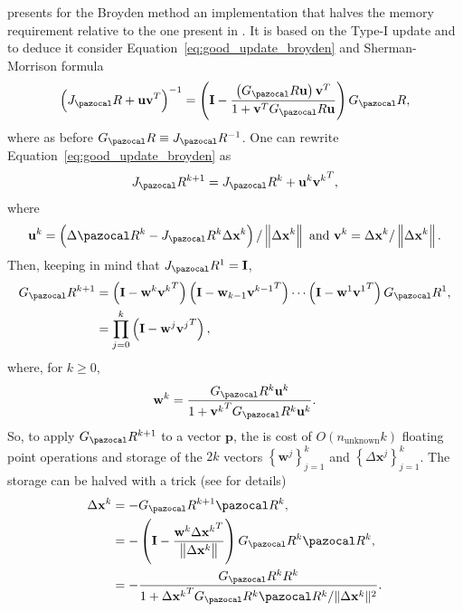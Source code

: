 \cite{kelley_solving_2003} presents for the Broyden method an implementation that halves the memory requirement relative to the one present in \cite{fang_two_2009}.
It is based on the Type-I update and to deduce it consider Equation~\eqref{eq:good_update_broyden} and Sherman-Morrison formula
\begin{equation}
  \left(J_\pazocal R+ \mathbf u \mathbf v^{T}\right)^{-1}=\left(\mathbf I- \frac{\left(G_\pazocal R \mathbf u\right) \mathbf v^{T}}{1+\mathbf v^{T} G_\pazocal R \mathbf u}\right) G_\pazocal R,
\end{equation}
where as before \(G_\pazocal R\equiv J_\pazocal R^{-1}\).
One can rewrite Equation~\eqref{eq:good_update_broyden} as
\begin{equation}
  J_\pazocal R^{k+1}=J_\pazocal R^k+ \mathbf u^k {\mathbf v^k}^{T},
\end{equation}
where
\begin{equation}
  \mathbf u^k=\left(\Delta \pazocal R^k - J_\pazocal R^k \Delta \mathbf x^{k}\right) /\left\|\Delta \mathbf x^{k}\right\| \text { and } \mathbf v^{k}=\Delta \mathbf x^{k} /\left\|\Delta \mathbf x^{k}\right\|.
\end{equation}
Then, keeping in mind that \(J_\pazocal R^{1}=\mathbf I\),
\begin{align}
G_\pazocal R^{k+1} &=\left(\mathbf I - \mathbf w^{k} {\mathbf v^{k}}^{T}\right)\left(\mathbf I - \mathbf w_{k-1} {\mathbf v^{k-1}}^{T}\right) \cdots\left(\mathbf I-\mathbf w^{1} {\mathbf v^{1}}^{T}\right) G_\pazocal R^1, \\
&=\prod_{j=0}^{k}\left(\mathbf I-\mathbf w^{j} {\mathbf v^{j}}^{T}\right),
\end{align}
where, for \(k \geq 0\),
\begin{equation}
  \mathbf w^{k}=\displaystyle\frac{G_\pazocal R^k \mathbf u^{k}}{1 + {\mathbf v^{k}}^{T} G_\pazocal R^k \mathbf u^{k}}.
\end{equation}
So, to apply \(G_\pazocal R^{k+1}\) to a vector \(\mathbf p\), the is cost of \(O(n_\text{unknown} k)\) floating point operations and storage of the \(2 k\) vectors \(\left\{\mathbf w^{j}\right\}_{j=1}^{k}\) and \(\left\{\Delta \mathbf x^{j}\right\}_{j=1}^{k}\).
The storage can be halved with a trick (see \cite{kelley_solving_2003} for details)
\begin{align}
\Delta \mathbf x^{k} &= - G_\pazocal R^{k+1}  \pazocal R^k,\\
&=-\left(\mathbf I-\frac{\mathbf w^{k} {\Delta \mathbf x^{k}}^{T}}{\left\|\Delta \mathbf x^{k}\right\|}\right) G_\pazocal R^k \pazocal R^k, \\
&= - \frac{G_\pazocal R^k R^k}{1 + {\Delta \mathbf x^k}^T G_\pazocal R^k \pazocal R^k /\|\Delta \mathbf x^k\|^2}.
\end{align}

